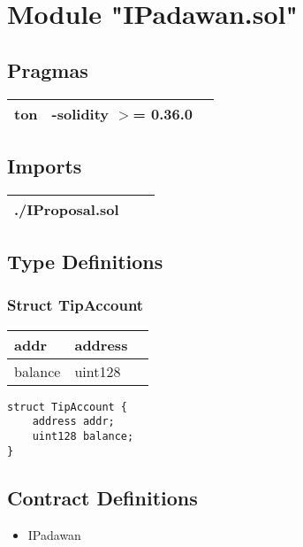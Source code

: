 
\section{Module "IPadawan.sol"}


\subsection{Pragmas}


\noindent\begin{tabular}{|l|l|p{5cm}|}\hline
ton & -solidity $>$= 0.36.0 &\\\hline
\end{tabular}


\subsection{Imports}


\noindent\begin{tabular}{|l|l|p{5cm}|}\hline
./IProposal.sol &\\\hline
\end{tabular}


\subsection{Type Definitions}


\subsubsection{Struct TipAccount}


\ifsoltables
\noindent\begin{tabular}{|l|l|p{6cm}|}\hline
addr & address & \\\hline
balance & uint128 & \\\hline
\end{tabular}
\fi


\begin{lstlisting}[firstnumber=5]
struct TipAccount {
    address addr;
    uint128 balance;
}
\end{lstlisting}

\subsection{Contract Definitions}

\begin{itemize}
\item IPadawan
\end{itemize}
